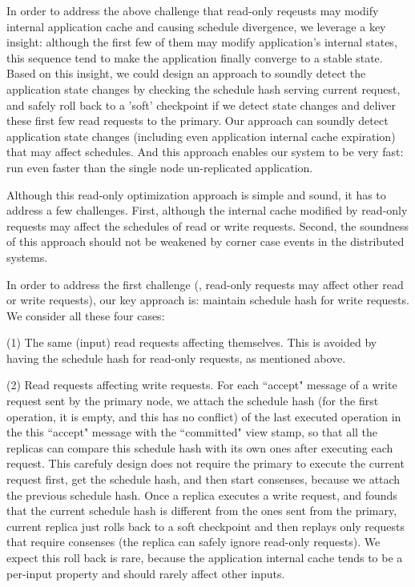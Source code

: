 In order to address the above challenge that read-only reqeusts may modify internal 
application cache and causing schedule divergence, we leverage a key 
insight: although the first few of them may modify application's internal states, this 
sequence tend to make the application finally converge to a stable state. Based 
on this insight, we could design an approach to soundly detect the application 
state changes by checking the schedule hash serving current request, and 
safely roll back to a 'soft' checkpoint if we detect state changes and 
deliver these first few read requests to the primary. Our approach can soundly 
detect application state changes (including even application internal cache 
expiration) that may affect schedules. And this approach enables our system 
to be very fast: run even faster than the single node un-replicated 
application.

Although this read-only optimization approach is simple and sound, it has to 
address a few challenges. First, although the internal cache modified by read-only 
requests may affect the schedules of read or write requests. Second, the 
soundness of this approach should not be weakened by corner case events in the 
distributed systems.

In order to address the first challenge (\ie, read-only requests may affect 
other read or write requests), our key approach is: maintain schedule hash for write 
requests. We consider all these four cases:

(1) The same (input) read requests affecting themselves. This is avoided by 
having the schedule hash for read-only requests, as mentioned above.

(2) Read requests affecting write requests. For each ``accept" message of a 
write request sent by the \paxos primary node, we attach the schedule hash (for 
the first operation, it is empty, and this has no conflict) of 
the last executed operation in the this ``accept" message with the ``committed" 
view stamp, so that all the replicas can compare this schedule hash with its 
own ones after executing each request. This carefuly design does not require 
the primary to execute the current request first, get the schedule hash, and 
then start consenses, because we attach the previous schedule hash. Once a 
replica executes a write request, and founds that the current schedule hash is 
different from the ones sent from the primary, current replica just rolls back 
to a soft checkpoint and then replays only requests that require consenses (the 
replica can safely ignore read-only requests). We expect this roll back is 
rare, because the application internal cache tends to be a per-input property 
and should rarely affect other inputs.

